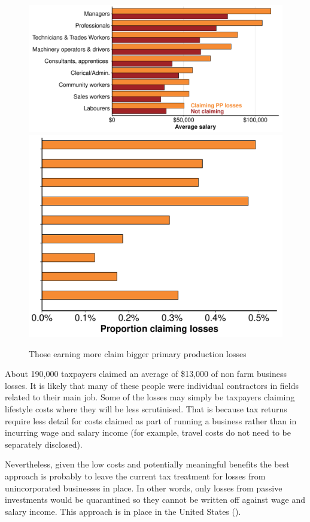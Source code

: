 \begin{figure}
\caption{Those earning more claim bigger primary production losses\label{fig:PP-losses-by-salary}}
{
	\includegraphics[width=1.27273\columnwidth]{CGT-NG-atlas/PP-losers-salary-comparison-horiz-bar-1.pdf}
}
{
	\includegraphics[width=0.8\columnwidth]{CGT-NG-atlas/Proportions-PP-losses-1.pdf}
}
\end{figure}
About 190,000 taxpayers claimed an average of \$13,000 of non farm business losses. It is likely that many of these people were individual contractors in fields related to their main job. Some of the losses may simply be taxpayers claiming lifestyle costs where they will be less scrutinised. 
That is because tax returns require less detail for costs claimed as part of running a business rather than in incurring wage and salary income (for example, travel costs do not need to be separately disclosed). 

Nevertheless, given the low costs and potentially meaningful benefits the best approach is probably to leave the current tax treatment for losses from unincorporated businesses in place. 
In other words, only losses from passive investments would be quarantined so they cannot be written off against wage and salary income. 
This approach is in place in the United States (). 


